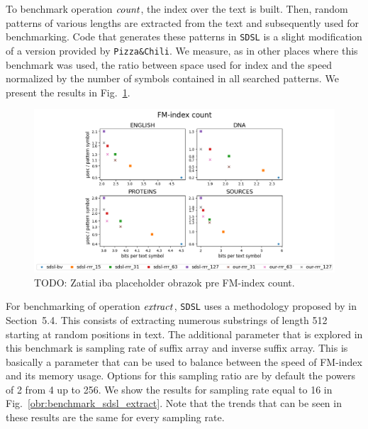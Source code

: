 To benchmark operation $\mathit{count}$, the index over the text is built. Then, random patterns of
various lengths are extracted from the text and subsequently used for benchmarking. Code
that generates these patterns in \texttt{SDSL} is a slight modification of a version provided
by \texttt{Pizza\&Chili}. We measure, as in other places where this benchmark was used, the
ratio between space used for index and the speed normalized by the number of symbols contained
in all searched patterns. We present the results in Fig.~\ref{obr:benchmark_sdsl_count}.

\begin{figure}
	\centerline{
		\includegraphics[width=\textwidth, height=0.35\textheight]{images/vysledky_sdsl_count}
	}
	\caption[TODO]{TODO: Zatial iba placeholder obrazok pre FM-index count.
	}
	\label{obr:benchmark_sdsl_count}
\end{figure}

For benchmarking of operation $\mathit{extract}$, \texttt{SDSL} uses a methodology proposed by
\cite{ferragina2009compressed} in Section~5.4. This consists of extracting numerous
substrings of length 512 starting at random positions in text. The additional parameter
that is explored in this benchmark is sampling rate of suffix array and inverse suffix array.
This is basically a parameter that can be used to balance between the speed of FM-index and
its memory usage. Options for this sampling ratio are by default the powers of 2 from 4 up to
256. We show the results for sampling rate equal to 16 in Fig.~\ref{obr:benchmark_sdsl_extract}.
Note that the trends that can be seen in these results are the same for every sampling rate.


